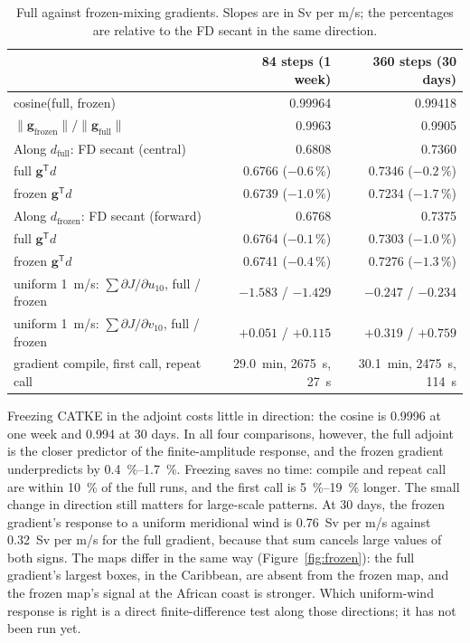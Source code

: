 \documentclass[11pt]{article}
\newcommand{\gvec}{\mathbf{g}}
\begin{document}
\begin{table}[h]
\centering\small
\begin{tabular}{@{}lrr@{}}
\toprule
& 84 steps (1 week) & 360 steps (30 days) \\
\midrule
cosine(full, frozen) & \num{0.99964} & \num{0.99418} \\
$\lVert\gvec_{\text{frozen}}\rVert / \lVert\gvec_{\text{full}}\rVert$ & \num{0.9963} & \num{0.9905} \\
\addlinespace
Along $d_{\text{full}}$: FD secant (central) & \num{0.6808} & \num{0.7360} \\
\quad full $\gvec^{\mathsf T}d$ & \num{0.6766} ($-0.6\,\%$) & \num{0.7346} ($-0.2\,\%$) \\
\quad frozen $\gvec^{\mathsf T}d$ & \num{0.6739} ($-1.0\,\%$) & \num{0.7234} ($-1.7\,\%$) \\
\addlinespace
Along $d_{\text{frozen}}$: FD secant (forward) & \num{0.6768} & \num{0.7375} \\
\quad full $\gvec^{\mathsf T}d$ & \num{0.6764} ($-0.1\,\%$) & \num{0.7303} ($-1.0\,\%$) \\
\quad frozen $\gvec^{\mathsf T}d$ & \num{0.6741} ($-0.4\,\%$) & \num{0.7276} ($-1.3\,\%$) \\
\addlinespace
uniform \SI{1}{m/s}: $\sum\partial J/\partial u_{10}$, full / frozen & $-1.583$ / $-1.429$ & $-0.247$ / $-0.234$ \\
uniform \SI{1}{m/s}: $\sum\partial J/\partial v_{10}$, full / frozen & $+0.051$ / $+0.115$ & $+0.319$ / $+0.759$ \\
\addlinespace
gradient compile, first call, repeat call & \SI{29.0}{min}, \SI{2675}{s}, \SI{27}{s} & \SI{30.1}{min}, \SI{2475}{s}, \SI{114}{s} \\
\bottomrule
\end{tabular}
\caption{Full against frozen-mixing gradients. Slopes are in Sv per m/s; the percentages are relative to
the FD secant in the same direction.}
\label{tab:frozen}
\end{table}

Freezing CATKE in the adjoint costs little in direction: the cosine is \num{0.9996} at one week and
\num{0.994} at 30 days. In all four comparisons, however, the full adjoint is the closer predictor of the
finite-amplitude response, and the frozen gradient underpredicts by \SIrange{0.4}{1.7}{\percent}. Freezing
saves no time: compile and repeat call are within \SI{10}{\percent} of the full runs, and the first call
is \SIrange{5}{19}{\percent} longer.
The small change in direction still matters for large-scale patterns. At 30 days, the frozen gradient's
response to a uniform meridional wind is \SI{+0.76}{Sv} per m/s against \SI{+0.32}{Sv} per m/s for the
full gradient, because that sum cancels large values of both signs. The maps differ in the same way
(Figure~\ref{fig:frozen}): the full gradient's largest boxes, in the Caribbean, are absent from the frozen
map, and the frozen map's signal at the African coast is stronger. Which uniform-wind response is right is
a direct finite-difference test along those directions; it has not been run yet.
\end{document}
